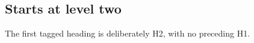 \documentclass[11pt]{article}
\begin{document}
\setcounter{section}{0}
\subsection{Starts at level two}
The first tagged heading is deliberately H2, with no preceding H1.
\end{document}

